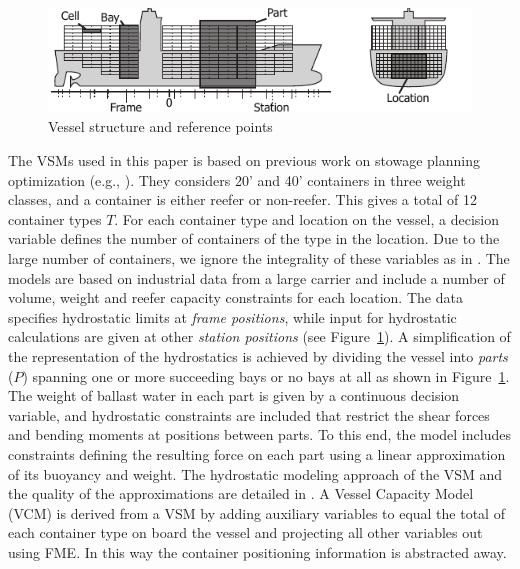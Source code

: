 \documentclass{llncs}
\begin{document}
\begin{figure}[b!]
	\centering
		\includegraphics{figures/vessel6.pdf}
	\caption{Vessel structure and reference points}
	\label{fig:vessel}
\end{figure}

The VSMs used in this paper is based on previous work on stowage planning optimization (e.g., \cite{pacino11,AlbertosThesis}).  
They considers 20' and 40' containers in three weight classes, and a container is either reefer or non-reefer. This gives a total of 12 container types $T$. 
For each container type and location on the vessel, a decision variable defines the number of containers of the type in the location. Due to the large number of containers, we ignore the integrality of these variables as in \cite{pacino11}. 
The models are based on industrial data from a large carrier and include a number of volume, weight and reefer capacity constraints for each location. The data specifies hydrostatic limits at \emph{frame positions}, while input for hydrostatic calculations are given at other \emph{station positions} (see Figure~\ref{fig:vessel}). A simplification of the representation of the hydrostatics is achieved by dividing the vessel into \emph{parts} ($P$) spanning one or more succeeding bays or no bays at all as shown in Figure~\ref{fig:vessel}. 
The weight of ballast water in each part is given by a continuous decision variable, and hydrostatic constraints are included that restrict the shear forces and bending moments at positions between parts. To this end, the model includes constraints defining the resulting force on each part using a linear approximation of its buoyancy and weight. The hydrostatic modeling approach of the VSM and the quality of the approximations are detailed in \cite{ICCL18}. 
%
A Vessel Capacity Model (VCM) is derived from a VSM by adding auxiliary variables to equal the total of each container type on board the vessel and projecting all other variables out using FME. In this way the container positioning information is abstracted away.
\end{document}
